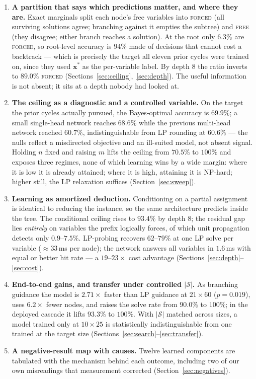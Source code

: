 \documentclass[12pt]{article}
\begin{document}
\begin{enumerate}
\item \textbf{A partition that says which predictions matter, and where they are.} Exact marginals split each node's free variables into \textsc{forced} (all surviving solutions agree; branching against it empties the subtree) and \textsc{free} (they disagree; either branch reaches a solution). At the root only $6.3\%$ are \textsc{forced}, so root-level accuracy is $94\%$ made of decisions that cannot cost a backtrack --- which is precisely the target all eleven prior cycles were trained on, since they used $\mathbf{x}^\ast$ as the per-variable label. By depth $8$ the ratio inverts to $89.0\%$ \textsc{forced} (Sections~\ref{sec:ceiling},~\ref{sec:depth}). The useful information is not absent; it sits at a depth nobody had looked at.

\item \textbf{The ceiling as a diagnostic and a controlled variable.} On the target the prior cycles actually pursued, the Bayes-optimal accuracy is $69.9\%$; a small single-head network reaches $68.6\%$ while the previous multi-head network reached $60.7\%$, indistinguishable from LP rounding at $60.6\%$ --- the nulls reflect a misdirected objective and an ill-suited model, not absent signal. Holding $n$ fixed and raising $m$ lifts the ceiling from $70.5\%$ to $100\%$ and exposes three regimes, none of which learning wins by a wide margin: where it is low it is already attained; where it is high, attaining it is NP-hard; higher still, the LP relaxation suffices (Section~\ref{sec:sweep}).

\item \textbf{Learning as amortized deduction.} Conditioning on a partial assignment is identical to reducing the instance, so the same architecture predicts inside the tree. The conditional ceiling rises to $93.4\%$ by depth $8$; the residual gap lies \emph{entirely} on variables the prefix logically forces, of which unit propagation detects only $0.9$--$7.5\%$. LP-probing recovers $62$--$79\%$ at one LP solve per variable ($\approx 33$\,ms per node); the network answers all variables in $1.6$\,ms with equal or better hit rate --- a $19$--$23\times$ cost advantage (Sections~\ref{sec:depth}--\ref{sec:cost}).

\item \textbf{End-to-end gains, and transfer under controlled $|\mathcal{S}|$.} As branching guidance the model is $2.71\times$ faster than LP guidance at $21\times60$ ($p=0.019$), uses $6.2\times$ fewer nodes, and raises the solve rate from $90.0\%$ to $100\%$; in the deployed cascade it lifts $93.3\%$ to $100\%$. With $|\mathcal{S}|$ matched across sizes, a model trained only at $10\times25$ is statistically indistinguishable from one trained at the target size (Sections~\ref{sec:search}--\ref{sec:transfer}).

\item \textbf{A negative-result map with causes.} Twelve learned components are tabulated with the mechanism behind each outcome, including two of our own misreadings that measurement corrected (Section~\ref{sec:negatives}).
\end{enumerate}
\end{document}
